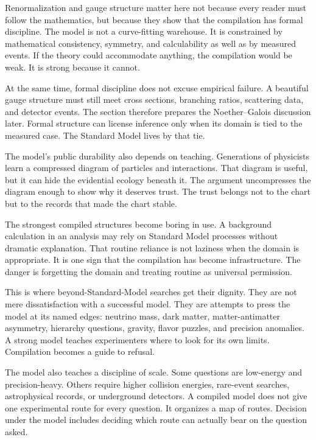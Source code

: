 Renormalization and gauge structure matter here not because every reader must
follow the mathematics, but because they show that the compilation has formal
discipline. The model is not a curve-fitting warehouse. It is constrained by
mathematical consistency, symmetry, and calculability as well as by measured
events. If the theory could accommodate anything, the compilation would be
weak. It is strong because it cannot.

At the same time, formal discipline does not excuse empirical failure. A
beautiful gauge structure must still meet cross sections, branching ratios,
scattering data, and detector events. The section therefore prepares the
Noether--Galois discussion later. Formal structure can license inference only
when its domain is tied to the measured case. The Standard Model lives by
that tie.

The model's public durability also depends on teaching. Generations of
physicists learn a compressed diagram of particles and interactions. That
diagram is useful, but it can hide the evidential ecology beneath it. The
argument uncompresses the diagram enough to show why it deserves trust. The trust
belongs not to the chart but to the records that made the chart stable.

The strongest compiled structures become boring in use. A background
calculation in an analysis may rely on Standard Model processes without
dramatic explanation. That routine reliance is not laziness when the domain
is appropriate. It is one sign that the compilation has become infrastructure.
The danger is forgetting the domain and treating routine as universal
permission.

This is where beyond-Standard-Model searches get their dignity. They are not
mere dissatisfaction with a successful model. They are attempts to press the
model at its named edges: neutrino mass, dark matter, matter-antimatter
asymmetry, hierarchy questions, gravity, flavor puzzles, and precision
anomalies. A strong model teaches experimenters where to look for its own
limits. Compilation becomes a guide to refusal.

The model also teaches a discipline of scale. Some questions are low-energy
and precision-heavy. Others require higher collision energies, rare-event
searches, astrophysical records, or underground detectors. A compiled model
does not give one experimental route for every question. It organizes a map of
routes. Decision under the model includes deciding which route can actually
bear on the question asked.

